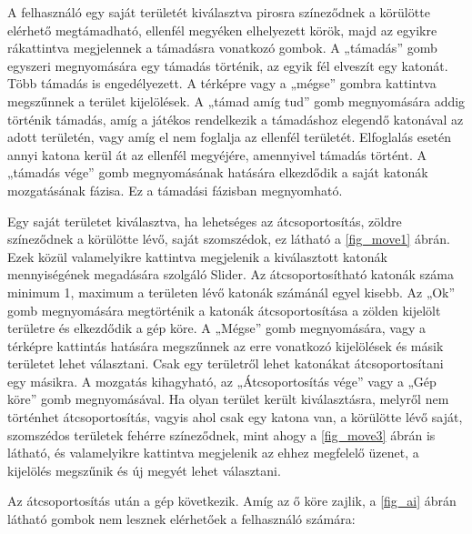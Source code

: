 

A felhasználó egy saját területét kiválasztva pirosra színeződnek a körülötte elérhető megtámadható, ellenfél megyéken elhelyezett körök, majd az egyikre rákattintva megjelennek a támadásra vonatkozó gombok.
A „támadás” gomb egyszeri megnyomására egy támadás történik, az egyik fél elveszít egy katonát.
Több támadás is engedélyezett.
A térképre vagy a „mégse” gombra kattintva megszűnnek a terület kijelölések.
A „támad amíg tud” gomb megnyomására addig történik támadás, amíg a játékos rendelkezik a támadáshoz elegendő katonával az adott területén, vagy amíg el nem foglalja az ellenfél területét.
Elfoglalás esetén annyi katona kerül át az ellenfél megyéjére, amennyivel támadás történt.
A „támadás vége” gomb megnyomásának hatására elkezdődik a saját katonák mozgatásának fázisa.
Ez a támadási fázisban megnyomható. 


%




Egy saját területet kiválasztva, ha lehetséges az átcsoportosítás, zöldre színeződnek a körülötte lévő, saját szomszédok, ez látható a \ref{fig_move1} ábrán.
Ezek közül valamelyikre kattintva megjelenik a kiválasztott katonák mennyiségének megadására szolgáló Slider.
Az átcsoportosítható katonák száma minimum 1, maximum a területen lévő katonák számánál egyel kisebb.
Az „Ok” gomb megnyomására megtörténik a katonák átcsoportosítása a zölden kijelölt területre és elkezdődik a gép köre.
A „Mégse” gomb megnyomására, vagy a térképre kattintás hatására megszűnnek az erre vonatkozó kijelölések és másik területet lehet választani.
Csak egy területről lehet katonákat átcsoportosítani egy másikra.
A mozgatás kihagyható, az „Átcsoportosítás vége” vagy a „Gép köre” gomb megnyomásával.
Ha olyan terület került kiválasztásra, melyről nem történhet átcsoportosítás, vagyis ahol csak egy katona van, a körülötte lévő saját, szomszédos területek fehérre színeződnek, mint ahogy a \ref{fig_move3} ábrán is látható, és valamelyikre kattintva megjelenik az ehhez megfelelő üzenet, a kijelölés megszűnik és új megyét lehet választani.  

 


Az átcsoportosítás után a gép következik. Amíg az ő köre zajlik, a \ref{fig_ai} ábrán látható gombok nem lesznek elérhetőek a felhasználó számára: 

